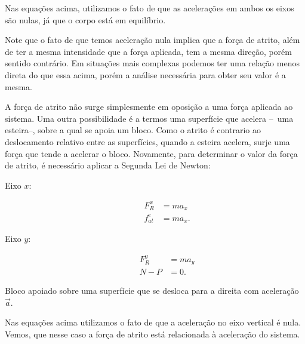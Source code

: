 \noindent{}Nas equações acima, utilizamos o fato de que as acelerações em ambos os eixos são nulas, já que o corpo está em equilíbrio.

Note que o fato de que temos aceleração nula implica que a força de atrito, além de ter a mesma intensidade que a força aplicada, tem a mesma direção, porém sentido contrário. Em situações mais complexas podemos ter uma relação menos direta do que essa acima, porém a análise necessária para obter seu valor é a mesma.

A força de atrito não surge simplesmente em oposição a uma força aplicada ao sistema. Uma outra possibilidade é a termos uma superfície que acelera --~uma esteira--, sobre a qual se apoia um bloco. Como o atrito é contrario ao deslocamento relativo entre as superfícies, quando a esteira acelera, surje uma força que tende a acelerar o bloco. Novamente, para determinar o valor da força de atrito, é necessário aplicar a Segunda Lei de Newton:
\begin{description}
    \item[Eixo $x$:]
        \begin{align}
            F_R^x &= m a_x \\
            f_{at}^e &= m a_x.
        \end{align}
    \item[Eixo $y$:]
        \begin{align}
            F_R^y &= m a_y \\
            N - P &= 0.
        \end{align}
\end{description}

\begin{marginfigure}
\centering
{}
\caption{Bloco apoiado sobre uma superfície que se desloca para a direita com aceleração $\vec{a}$.}
\end{marginfigure}
%
Nas equações acima utilizamos o fato de que a aceleração no eixo vertical é nula. Vemos, que nesse caso a força de atrito está relacionada à aceleração do sistema.

